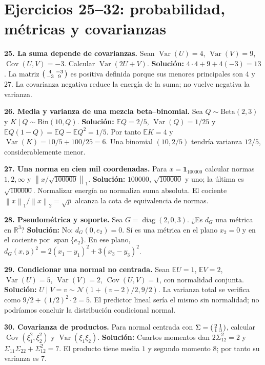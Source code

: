 \documentclass[11pt,a4paper]{article}
\newcommand{\R}{\mathbb R}
\newcommand{\E}{\mathbb E}
\newcommand{\norm}[1]{\left\lVert #1\right\rVert}
\DeclareMathOperator{\Var}{Var}
\DeclareMathOperator{\Cov}{Cov}
\DeclareMathOperator{\spanop}{span}
\DeclareMathOperator{\diag}{diag}
\newcommand{\ones}{\mathbf 1}
\theoremstyle{definition}
\begin{document}
\section{Ejercicios 25--32: probabilidad, métricas y covarianzas}
\textbf{25. La suma depende de covarianzas.} Sean $\Var(U)=4$, $\Var(V)=9$, $\Cov(U,V)=-3$. Calcular $\Var(2U+V)$.\quad
\textbf{Solución:} $4\cdot4+9+4(-3)=13$. La matriz $\begin{psmallmatrix}4&-3\\-3&9\end{psmallmatrix}$ es positiva definida porque sus menores principales son $4$ y $27$. La covarianza negativa reduce la energía de la suma; no vuelve negativa la varianza.

\textbf{26. Media y varianza de una mezcla beta--binomial.} Sea $Q\sim\mathrm{Beta}(2,3)$ y $K\mid Q\sim\mathrm{Bin}(10,Q)$.\quad
\textbf{Solución:} $\E Q=2/5$, $\Var(Q)=1/25$ y $\E Q(1-Q)=\E Q-\E Q^2=1/5$. Por tanto $\E K=4$ y $\Var(K)=10/5+100/25=6$. Una binomial $(10,2/5)$ tendría varianza $12/5$, considerablemente menor.

\textbf{27. Una norma en cien mil coordenadas.} Para $x=\ones_{100000}$ calcular normas $1,2,\infty$ y $\norm{x/\sqrt{100000}}_1$.\quad
\textbf{Solución:} $100000$, $\sqrt{100000}$ y uno; la última es $\sqrt{100000}$. Normalizar energía no normaliza suma absoluta. El cociente $\norm x_1/\norm x_2=\sqrt p$ alcanza la cota de equivalencia de normas.

\textbf{28. Pseudométrica y soporte.} Sea $G=\diag(2,0,3)$. ¿Es $d_G$ una métrica en $\R^3$?\quad
\textbf{Solución:} No: $d_G(0,e_2)=0$. Sí es una métrica en el plano $x_2=0$ y en el cociente por $\spanop\{e_2\}$. En ese plano, $d_G(x,y)^2=2(x_1-y_1)^2+3(x_3-y_3)^2$.

\textbf{29. Condicionar una normal no centrada.} Sean $\E U=1$, $\E V=2$, $\Var(U)=5$, $\Var(V)=2$, $\Cov(U,V)=1$, con normalidad conjunta.\quad
\textbf{Solución:} $U\mid V=v\sim\mathcal N(1+(v-2)/2,9/2)$. La varianza total se verifica como $9/2+(1/2)^2\cdot2=5$. El predictor lineal sería el mismo sin normalidad; no podríamos concluir la distribución condicional normal.

\textbf{30. Covarianza de productos.} Para normal centrada con $\Sigma=\begin{psmallmatrix}2&1\\1&3\end{psmallmatrix}$, calcular $\Cov(\xi_1^2,\xi_2^2)$ y $\Var(\xi_1\xi_2)$.\quad
\textbf{Solución:} Cuartos momentos dan $2\Sigma_{12}^2=2$ y $\Sigma_{11}\Sigma_{22}+\Sigma_{12}^2=7$. El producto tiene media $1$ y segundo momento $8$; por tanto su varianza es $7$.
\end{document}
